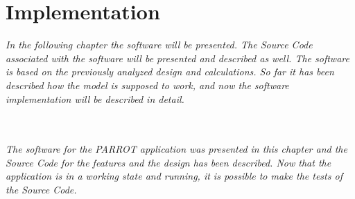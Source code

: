 \chapter{Implementation}
\label{imp}
\textit{In the following chapter the software will be presented. The Source Code associated with the software will be presented and described as well. The software is based on the previously analyzed design and calculations. So far it has been described how the model is supposed to work, and now the software implementation will be described in detail.}

\\
\\
\textit{The software for the PARROT application was presented in this chapter and the Source Code for the features and the design has been described. Now that the application is in a working state and running, it is possible to make the tests of the Source Code.}